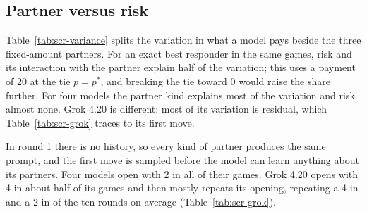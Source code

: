 \documentclass[10pt]{article}
\let\plainsubsection\subsection
\renewcommand{\subsection}{\FloatBarrier\needspace{8\baselineskip}\plainsubsection}
\newcommand{\popt}{p^{*}}
\begin{document}
\begin{table}[h]
\caption{Beside partners who always pay 0: expected payoff of one of these partners minus the model seat's expected payoff (ten games per risk level, 50 over all risks). Here it equals the gap to the best response in Table~\ref{tab:scr-outcomes}.}
\label{tab:scr-free}
\centering\small

\end{table}

\subsection{Partner versus risk}

Table~\ref{tab:scr-variance} splits the variation in what a model pays beside the three fixed-amount partners. For an exact best responder in the same games, risk and its interaction with the partner explain half of the variation; this uses a payment of 20 at the tie $p=\popt$, and breaking the tie toward 0 would raise the share further. For four models the partner kind explains most of the variation and risk almost none. Grok 4.20 is different: most of its variation is residual, which Table~\ref{tab:scr-grok} traces to its first move.

\begin{table}[h]
\caption{Share of the variation in the model seat's total explained by the partner kind, the risk and their interaction, over partners who always pay 0, 2 or 4 (150 games per model; balanced two-way sums of squares). \emph{Risk and interaction} is computed before rounding, so it can differ by 1 from the sum of the two rounded columns.}
\label{tab:scr-variance}
\centering\small

\end{table}

In round 1 there is no history, so every kind of partner produces the same prompt, and the first move is sampled before the model can learn anything about its partners. Four models open with 2 in all \SupScrOthersOpenTwo{} of their games. Grok 4.20 opens with 4 in about half of its games and then mostly repeats its opening, repeating a 4 in \SupScrGrokRepeatFour{} and a 2 in \SupScrGrokRepeatTwo{} of the ten rounds on average (Table~\ref{tab:scr-grok}).

\begin{table}[h]
\caption{Top: Grok 4.20's opening move and its mean ten-round total after each opening, by kind of partner (50 games each). No model ever opens with 0. Bottom: share of the variation in each model's total explained on its own by the opening move, by the partner kind (all four kinds) and by the risk (one-way sums of squares over 200 games). Because this uses all four kinds and one-way shares, the partner share can differ slightly from Table~\ref{tab:scr-variance}.}
\label{tab:scr-grok}
\centering\small

\end{table}
\end{document}
